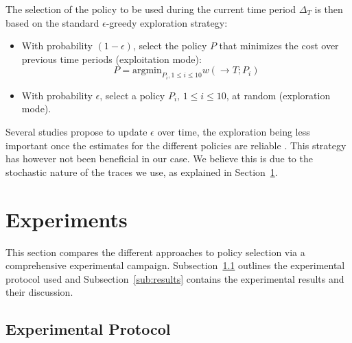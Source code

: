 \documentclass[sigconf]{acmart}
\begin{document}
The selection of the policy to be used during the current time period $\Delta_T$ is then based on the standard $\epsilon$-greedy exploration strategy:
%
\begin{itemize}
\item With probability $(1-\epsilon)$, select the policy $P$ that minimizes the cost over previous time periods (exploitation mode):
%
\begin{equation}
\label{eq:select-greedy}
P = \mbox{argmin}_{P_i, 1 \le i \le 10} w(\rightarrow T;P_i)
\end{equation}
%
\item With probability $\epsilon$, select a policy $P_i, \, 1 \le i \le 10$, at random (exploration mode).
\end{itemize}

Several studies propose to update $\epsilon$ over time, the exploration being less important once the estimates for the different policies are reliable \cite{Tokic:2010}. This strategy has however not been beneficial in our case. We believe this is due to the stochastic nature of the traces we use, as explained in Section~\ref{sec:experiments}.


\section{Experiments}
\label{sec:experiments}

This section compares the different approaches to policy selection via a
comprehensive experimental campaign.  Subsection~\ref{sub:protocol} outlines
the experimental protocol used and Subsection~\ref{sub:results} contains the
experimental results and their discussion.

\subsection{Experimental Protocol}
\label{sub:protocol}
\end{document}
